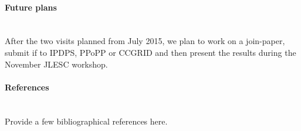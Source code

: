 \begin{refsection}
\paragraph{Future plans}~\\

After the two visits planned from July 2015, we plan to work on a join-paper, submit if to IPDPS, PPoPP or CCGRID and then present the results during the November JLESC workshop.

\paragraph{References}~\\

Provide a few bibliographical references here.

\printbibliography[heading=none,notkeyword=own]

\end{refsection}

